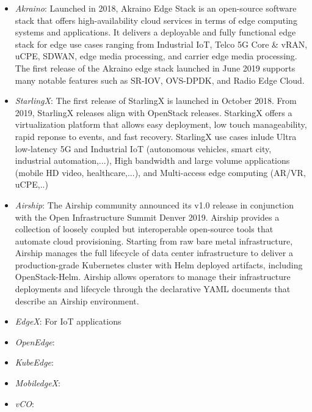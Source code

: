 \begin{itemize}

\item \textit{\textit{Akraino}}: Launched in 2018, Akraino Edge Stack is an open-source software stack that offers high-availability cloud services in terms of edge computing systems and applications. It delivers a deployable and fully functional edge stack for edge use cases ranging from Industrial IoT, Telco 5G Core \& vRAN, uCPE, SDWAN, edge media processing, and carrier edge media processing. The first release of the Akraino edge stack launched in June 2019 supports many notable features such as SR-IOV, OVS-DPDK, and Radio Edge Cloud.  

\item \textit{\textit{StarlingX}}: The first release of StarlingX is launched in October 2018. From 2019, StarlingX releases align with OpenStack releases. StarkingX offers a virtualization platform that allows easy deployment, low touch manageability, rapid reponse to events, and fast recovery. StarlingX use cases inlude Ultra low-latency 5G and Industrial IoT (autonomous vehicles, smart city, industrial automation,...), High bandwidth and large volume applications (mobile HD video, healthcare,...), and Multi-access edge computing (AR/VR, uCPE,..)

\item \textit{\textit{Airship}}: The Airship community announced its v1.0 release in conjunction with the Open Infrastructure Summit Denver 2019. Airship provides a collection of loosely coupled but interoperable open-source tools that automate cloud provisioning. Starting from raw bare metal infrastructure, Airship manages the full lifecycle of data center infrastructure to deliver a production-grade Kubernetes cluster with Helm deployed artifacts, including OpenStack-Helm. Airship allows operators to manage their infrastructure deployments and lifecycle through the declarative YAML documents that describe an Airship environment.

\item \textit{\textit{EdgeX}}: For IoT applications

\item \textit{\textit{OpenEdge}}:

\item \textit{\textit{KubeEdge}}:

\item \textit{\textit{MobiledgeX}}:

\item \textit{\textit{vCO}}:

\end{itemize}

